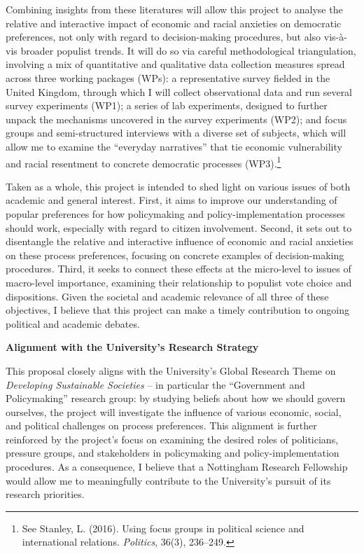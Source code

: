 \documentclass[fontsize=10.5pt,letterpaper]{scrartcl}
\begin{document}
Combining insights from these literatures will allow this project to analyse the relative and interactive impact of economic and racial anxieties on democratic preferences, not only with regard to decision-making procedures, but also vis-à-vis broader populist trends. It will do so via careful methodological triangulation, involving a mix of quantitative and qualitative data collection measures spread across three working packages (WPs): a representative survey fielded in the United Kingdom, through which I will collect observational data and run several survey experiments (WP1); a series of lab experiments, designed to further unpack the mechanisms uncovered in the survey experiments (WP2); and focus groups and semi-structured interviews with a diverse set of subjects, which will allow me to examine the “everyday narratives” that tie economic vulnerability and racial resentment to concrete democratic processes (WP3).\footnote{See Stanley, L. (2016). Using focus groups in political science and international relations. \textit{Politics}, 36(3), 236–249.}

Taken as a whole, this project is intended to shed light on various issues of both academic and general interest. First, it aims to improve our understanding of popular preferences for how policymaking and policy-implementation processes should work, especially with regard to citizen involvement. Second, it sets out to disentangle the relative and interactive influence of economic and racial anxieties on these process preferences, focusing on concrete examples of decision-making procedures. Third, it seeks to connect these effects at the micro-level to issues of macro-level importance, examining their relationship to populist vote choice and dispositions. Given the societal and academic relevance of all three of these objectives, I believe that this project can make a timely contribution to ongoing political and academic debates.

\textbf{Alignment with the University’s Research Strategy}
\vspace{-.9em}

This proposal closely aligns with the University’s Global Research Theme on \textit{Developing Sustainable Societies} -- in particular the “Government and Policymaking” research group: by studying beliefs about how we should govern ourselves, the project will investigate the influence of various economic, social, and political challenges on process preferences. This alignment is further reinforced by the project’s focus on examining the desired roles of politicians, pressure groups, and stakeholders in policymaking and policy-implementation procedures. As a consequence, I believe that a Nottingham Research Fellowship would allow me to meaningfully contribute to the University’s pursuit of its research priorities.
\end{document}
